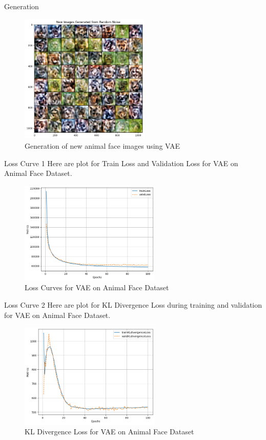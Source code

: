 \begin{frame}{Generation}
    \begin{figure}
        \centering
        \includegraphics[width=0.55\textwidth]{../ReportNeurips/generationFull.png}
        \caption{Generation of new animal face images using VAE}
    \end{figure}
\end{frame}

\begin{frame}{Loss Curve 1}
    Here are plot for Train Loss and Validation Loss for VAE on Animal Face Dataset.
    \begin{figure}
        \centering
        \includegraphics[width=0.6\textwidth]{../ReportNeurips/losscurve.png}
        \caption{Loss Curves for VAE on Animal Face Dataset}
    \end{figure}
\end{frame}

\begin{frame}{Loss Curve 2}
    Here are plot for KL Divergence Loss during training and validation for VAE on Animal Face Dataset.
    \begin{figure}
        \centering
        \includegraphics[width=0.6\textwidth]{../ReportNeurips/klLoss.png}
        \caption{KL Divergence Loss for VAE on Animal Face Dataset}
    \end{figure}
\end{frame}

